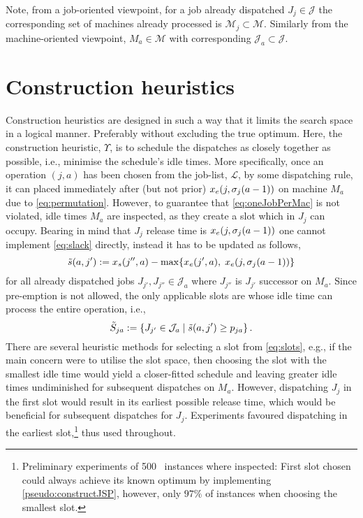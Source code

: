 Note, from a job-oriented viewpoint, for a job already dispatched 
$J_j\in\mathcal{J}$ the corresponding set of machines already processed is 
$\mathcal{M}_j\subset\mathcal{M}$. Similarly from the machine-oriented 
viewpoint, $M_a\in\mathcal{M}$ with corresponding 
$\mathcal{J}_a\subset\mathcal{J}$. 

\section{Construction heuristics}\label{sec:CH}
Construction heuristics are designed in such a way that it limits the search 
space in a logical manner. Preferably without excluding the true optimum. 
Here, the construction heuristic, $\Upsilon$, is to schedule the dispatches as 
closely together as possible, i.e., minimise the schedule's idle times. 
More specifically, once an operation $(j,a)$ has been chosen from the job-list, 
$\mathcal{L}$, by some dispatching rule, it can placed immediately after (but 
not prior) $x_e(j,{\mathbf{\sigma}}_j(a-1))$ on machine $M_a$ due to 
\cref{eq:permutation}.
However, to guarantee that \cref{eq:oneJobPerMac} is not violated, 
idle times $M_a$ are inspected, as they create a slot which in $J_j$ can 
occupy. Bearing in mind that $J_j$ release time is $x_e(j,{\mathbf{\sigma}}_j(a-1))$ one 
cannot implement \cref{eq:slack} directly, instead it has to be updated as 
follows,
\begin{equation}
\tilde{s}(a,j') := x_s(j'',a)-\max\{x_e(j',a),\;x_e(j,\vsigma_j(a-1))\} %
\end{equation}
for all already dispatched jobs $J_{j'},J_{j''}\in \mathcal{J}_a$ where 
$J_{j''}$ is $J_{j'}$ successor on $M_a$. Since pre-emption is not allowed, the 
only applicable slots are whose idle time can process the entire operation, 
i.e.,
\begin{equation}
\tilde{S}_{ja} := \condset{J_{j'}\in \mathcal{J}_a}{\tilde{s}(a,j')\geq 
    p_{ja} }\label{eq:slots}.
\end{equation} 
There are several heuristic methods for selecting a slot from 
\cref{eq:slots}, e.g., if the main concern were to utilise the slot space, then 
choosing the slot with the smallest idle time would yield a closer-fitted 
schedule and leaving greater idle times undiminished for subsequent dispatches 
on $M_a$. However, dispatching $J_j$ in the first slot would result in its 
earliest possible release time, which would be beneficial for subsequent 
dispatches for $J_j$. Experiments favoured dispatching in the 
earliest slot,\footnote{Preliminary experiments of 500 \JSP\ instances where 
    inspected: First slot chosen could always achieve its known optimum by 
    implementing \cref{pseudo:constructJSP}, however, only $97\%$ of
    instances when choosing the smallest slot.} 
thus used throughout.

